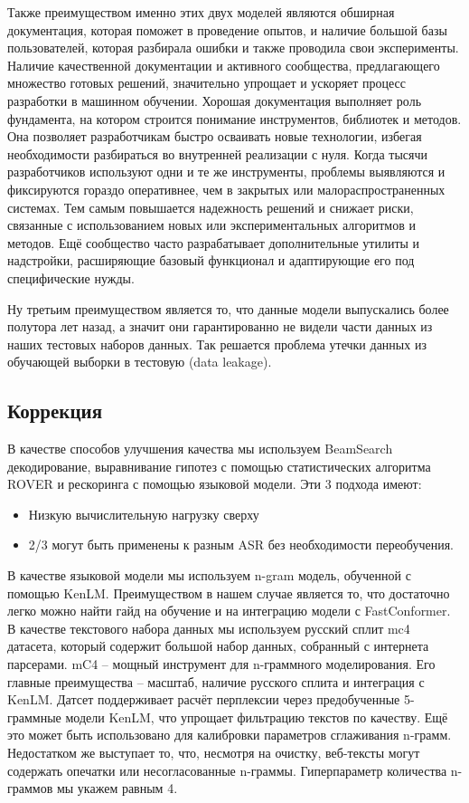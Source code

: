 Также преимуществом именно этих двух моделей являются обширная документация, которая поможет в проведение опытов, и наличие большой базы пользователей, которая разбирала ошибки и также проводила свои эксперименты.
Наличие качественной документации и активного сообщества, предлагающего множество готовых решений, значительно упрощает и ускоряет процесс разработки в машинном обучении. Хорошая документация выполняет роль фундамента, на котором строится понимание инструментов, библиотек и методов.
Она позволяет разработчикам быстро осваивать новые технологии, избегая необходимости разбираться во внутренней реализации с нуля.
Когда тысячи разработчиков используют одни и те же инструменты, проблемы выявляются и фиксируются гораздо оперативнее, чем в закрытых или малораспространенных системах.
Тем самым повышается надежность решений и снижает риски, связанные с использованием новых или экспериментальных алгоритмов и методов.
Ещё сообщество часто разрабатывает дополнительные утилиты и надстройки, расширяющие базовый функционал и адаптирующие его под специфические нужды.

Ну третьим преимуществом является то, что данные модели выпускались более полутора лет назад, а значит они гарантированно не видели части данных из наших тестовых наборов данных.
Так решается проблема утечки данных из обучающей выборки в тестовую (data leakage).

\subsection{Коррекция}

В качестве способов улучшения качества мы используем BeamSearch декодирование, выравнивание гипотез с помощью статистических алгоритма ROVER и рескоринга с помощью языковой модели.
Эти 3 подхода имеют:
\begin{itemize}
  \item Низкую вычислительную нагрузку сверху
  \item 2/3 могут быть применены к разным ASR без необходимости переобучения.
\end{itemize}

В качестве языковой модели мы используем n-gram модель, обученной с помощью KenLM\cite{heafield2011kenlm}.
Преимуществом в нашем случае является то, что достаточно легко можно найти гайд на обучение и на интеграцию модели с FastConformer.
В качестве текстового набора данных мы используем русский сплит mc4 датасета, который содержит большой набор данных, собранный с интернета парсерами.
mC4\cite{xue2020mt5,raffel2020exploring} -- мощный инструмент для n-граммного моделирования.
Его главные преимущества -- масштаб, наличие русского сплита и интеграция с KenLM.
Датсет поддерживает расчёт перплексии через предобученные 5-граммные модели KenLM, что упрощает фильтрацию текстов по качеству.
Ещё это может быть использовано для калибровки параметров сглаживания n-грамм.
Недостатком же выступает то, что, несмотря на очистку, веб-тексты могут содержать опечатки или несогласованные n-граммы.
Гиперпараметр количества n-граммов мы укажем равным 4.

